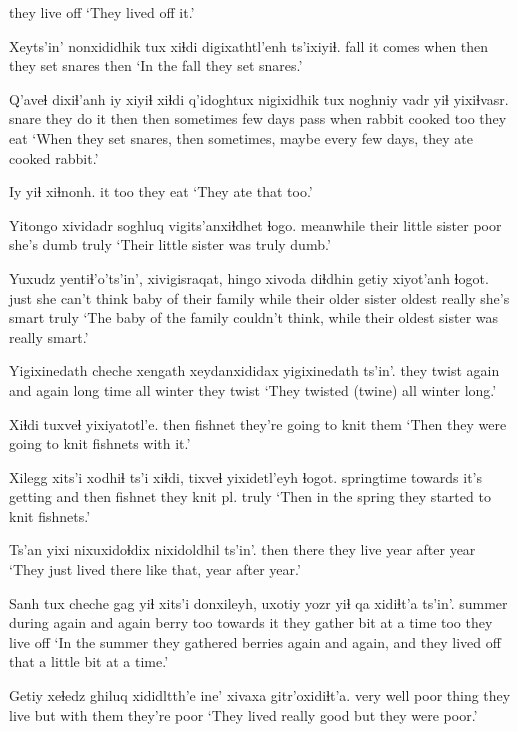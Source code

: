 \documentclass[12pt]{article}
\begin{document}
{{they live off}}
\glt `They lived off it.'
\glend

\gll Xeyts'in' nonxididhik tux  xiɬdi digixathtl'enh ts'ixiyiɬ.
fall      {it comes}    when then  {they set snares} then
\glt `In the fall they set snares.'
\glend

\gll Q'aveɬ dixiɬ'anh iy xiyiɬ xiɬdi q'idoghtux nigixidhik  tux noghniy vadr yiɬ yixiɬvasr. 
snare  {they do}   it then  then  sometimes  {few days pass} when rabbit cooked too {they eat}
\glt `When they set snares, then sometimes, maybe every few days, they ate cooked rabbit.'
\glend

\gll Iy yiɬ xiɬnonh. 
it too {they eat}
\glt `They ate that too.'
\glend

\gll Yitongo xividadr soghluq vigits'anxiɬdhet ɬogo.
meanwhile {their little sister} poor {she's dumb} truly
\glt `Their little sister was truly dumb.'
\glend

\gll Yuxudz {yentiɬ'o'ts'in'}, xivigisraqat, hingo xivoda diɬdhin getiy xiyot'anh ɬogot.
just   {she can't think} {baby of their family} while {their older sister} {oldest} really {she's smart} truly
\glt `The baby of the family couldn't think, while their oldest sister was really smart.'
\glend

\gll Yigixinedath cheche xengath xeydanxididax yigixinedath ts'in'.
{they twist}   {again and again} {long time} {all winter} {they twist}
\glt `They twisted (twine) all winter long.'
\glend

\gll Xiɬdi tuxveɬ yixiyatotl'e.
then  fishnet {they're going to knit them}
\glt `Then they were going to knit fishnets with it.'
\glend

\gll Xilegg xits'i xodhiɬ ts'i xiɬdi, tixveɬ yixidetl'eyh ɬogot.
springtime towards {it's getting} and then fishnet {they knit pl.} truly
\glt `Then in the spring they started to knit fishnets.'
\glend

\gll Ts'an yixi {nixuxidoɬdix} {nixidoldhil ts'in'.}
then there {they live}     {year after year}
\glt `They just lived there like that, year after year.'
\glend

\gll Sanh tux cheche gag yiɬ xits'i donxileyh, {uxotiy yozr} yiɬ {qa xidiɬt'a} ts'in'.
summer during {again and again} berry too {towards it} {they gather} {bit at a time} too {they live off }
\glt `In the summer they gathered berries again and again, and they lived off that a little bit at a time.'
\glend

\gll Getiy xeɬedz ghiluq xididltth'e ine' xivaxa gitr'oxidiɬt'a.
very  well   {poor thing} {they live} but {with them} {they're poor}
\glt `They lived really good but they were poor.'
\glend
\end{document}
